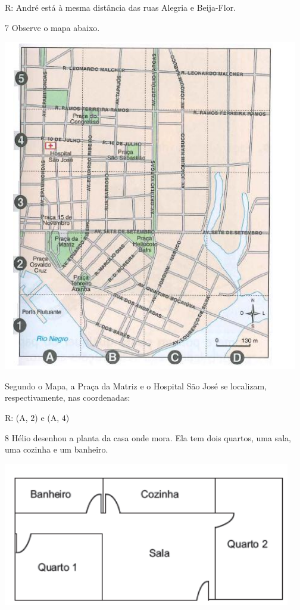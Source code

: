 R: André está à mesma distância das ruas Alegria e Beija-Flor.

\num{7}  Observe o mapa abaixo.

\includegraphics[width=5.08333in,height=5.71875in]{./imgSAEB_6_MAT/media/image70.png}

Segundo o Mapa, a Praça da Matriz e o Hospital São José se localizam,
respectivamente, nas coordenadas:

R: (A, $2$) e (A, $4$)

\num{8}  Hélio desenhou a planta da casa onde mora. Ela tem dois quartos, uma
sala, uma cozinha e um banheiro.

\includegraphics[width=4.94792in,height=2.46875in]{./imgSAEB_6_MAT/media/image71.png}

